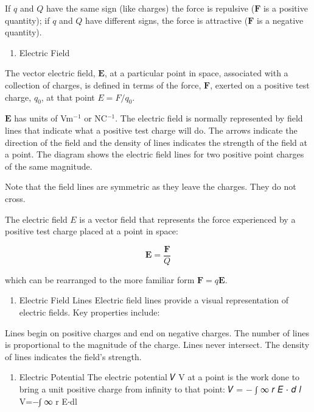 \documentclass[
  letterpaper,
  DIV=11,
  numbers=noendperiod]{scrreprt}
\providecommand{\tightlist}{%
  \setlength{\itemsep}{0pt}\setlength{\parskip}{0pt}}\usepackage{longtable,booktabs,array}
\begin{document}
If \(q\) and \(Q\) have the same sign (like charges) the force is
repulsive (\(\mathrm{\mathbf{F}}\) is a positive quantity); if \(q\) and
\(Q\) have different signs, the force is attractive
(\(\mathrm{\mathbf{F}}\) is a negative quantity).

\begin{enumerate}
\def\labelenumi{\arabic{enumi}.}
\setcounter{enumi}{2}
\tightlist
\item
  Electric Field
\end{enumerate}

The vector electric field, \(\mathbf{E}\), at a particular point in
space, associated with a collection of charges, is defined in terms of
the force, \(\mathbf{F}\), exerted on a positive test charge, \(q_0\),
at that point \(E = F/q_0\).

\(\mathbf{E}\) has units of Vm\(^{-1}\) or NC\(^{-1}\). The electric
field is normally represented by field lines that indicate what a
positive test charge will do. The arrows indicate the direction of the
field and the density of lines indicates the strength of the field at a
point. The diagram shows the electric field lines for two positive point
charges of the same magnitude.

Note that the field lines are symmetric as they leave the charges. They
do not cross.

The electric field \(\mathbf{\mathrm{𝐸}}\) is a vector field that
represents the force experienced by a positive test charge placed at a
point in space:

\[ \mathrm{\mathbf{E}}= \frac{\mathrm{\mathbf{F}}}{Q} \]

\noindent which can be rearranged to the more familiar form
\(\mathrm{\mathbf{F}}= q \mathrm{\mathbf{E}}\). \hspace{0pt}

\begin{enumerate}
\def\labelenumi{\arabic{enumi}.}
\setcounter{enumi}{4}
\tightlist
\item
  Electric Field Lines Electric field lines provide a visual
  representation of electric fields. Key properties include:
\end{enumerate}

Lines begin on positive charges and end on negative charges. The number
of lines is proportional to the magnitude of the charge. Lines never
intersect. The density of lines indicates the field's strength.

\begin{enumerate}
\def\labelenumi{\arabic{enumi}.}
\setcounter{enumi}{8}
\tightlist
\item
  Electric Potential The electric potential 𝑉 V at a point is the work
  done to bring a unit positive charge from infinity to that point: 𝑉 =
  − ∫ ∞ 𝑟 𝐸 ⋅ 𝑑 𝑙 V=−∫ ∞ r \hspace{0pt} E⋅dl
\end{enumerate}
\end{document}

